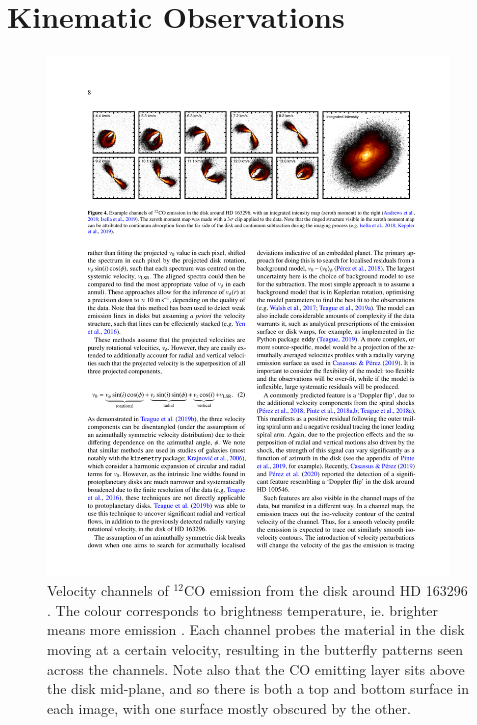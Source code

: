 \section{Kinematic Observations}

\begin{figure}
    \centering
    \includegraphics[width = 0.95\textwidth]{figures/channels.pdf}
    \caption{Velocity channels of $^{12}$CO emission from the disk around HD 163296 \citep{andrews2018}. The colour corresponds to brightness temperature, ie. brighter means more emission \citep{diskdynamicscollaboration2020}. Each channel probes the material in the disk moving at a certain velocity, resulting in the butterfly patterns seen across the channels. Note also that the CO emitting layer sits above the disk mid-plane, and so there is both a top and bottom surface in each image, with one surface mostly obscured by the other.}
    \label{fig:channels}
\end{figure}


